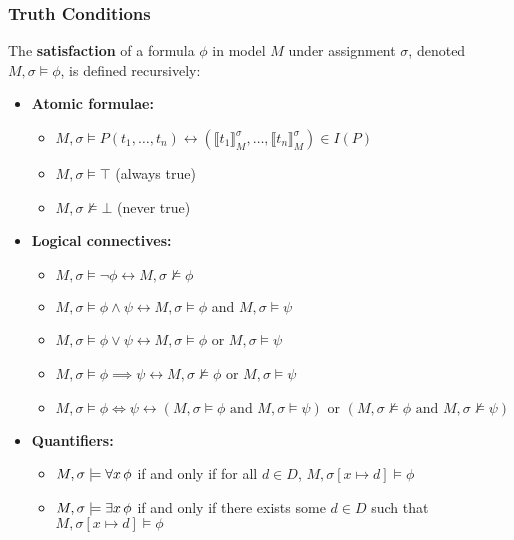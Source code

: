 \subsubsection{Truth Conditions}
The \textbf{satisfaction} of a formula \(\phi\) in model \(M\) under assignment \(\sigma\), denoted \(M, \sigma \models \phi\), is defined recursively:

\begin{itemize}
  \item \textbf{Atomic formulae:}
  \begin{itemize}
    \item \(M, \sigma \models P(t_1, \ldots, t_n) \leftrightarrow (\llbracket t_1 \rrbracket_M^\sigma, \ldots, \llbracket t_n \rrbracket_M^\sigma) \in I(P)\)
    \item \(M, \sigma \models \top\) (always true)
    \item \(M, \sigma \not\models \bot\) (never true)
  \end{itemize}
  
  \item \textbf{Logical connectives:}
  \begin{itemize}
    \item \(M, \sigma \models \neg \phi \leftrightarrow M, \sigma \not\models \phi\)
    \item \(M, \sigma \models \phi \land \psi \leftrightarrow M, \sigma \models \phi\) and \(M, \sigma \models \psi\)
    \item \(M, \sigma \models \phi \lor \psi \leftrightarrow M, \sigma \models \phi\) or \(M, \sigma \models \psi\)
    \item \(M, \sigma \models \phi \implies \psi \leftrightarrow M, \sigma \not\models \phi\) or \(M, \sigma \models \psi\)
    \item \(M, \sigma \models \phi \iff \psi \leftrightarrow \left(M, \sigma \models \phi \text{ and } M, \sigma \models \psi\right) \text{ or } \left(M, \sigma \not\models \phi \text{ and } M, \sigma \not\models \psi\right)\)
  \end{itemize}
  
  \item \textbf{Quantifiers:}
  \begin{itemize}
    \item \(M, \sigma \models \forall x  \,  \phi\) if and only if for all \(d \in D\), \(M, \sigma[x \mapsto d] \models \phi\)
    \item \(M, \sigma \models \exists x  \,  \phi\) if and only if there exists some \(d \in D\) such that \(M, \sigma[x \mapsto d] \models \phi\)
  \end{itemize}
\end{itemize}

